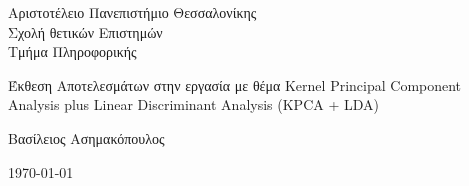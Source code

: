 \begin{titlepage}
	\afterpage{\blankpage}	
	\begin{figure}[H]
		\begin{center}
			\label{fig:cover_auth_logo}
		\end{center}
	\end{figure}
	
	\centering
	\Large Αριστοτέλειο Πανεπιστήμιο Θεσσαλονίκης\\
	\Large Σχολή θετικών Επιστημών\\
	\large Τμήμα Πληροφορικής\\
	
	
	\vspace{\fill}
	
	\LARGE Έκθεση Αποτελεσμάτων στην εργασία με θέμα Kernel Principal Component Analysis plus Linear Discriminant Analysis (KPCA + LDA)
	
	\vspace{\fill}
	
	Βασίλειος Ασημακόπουλος
	
	
	
	\centering
	
	\today
	
\end{titlepage}






